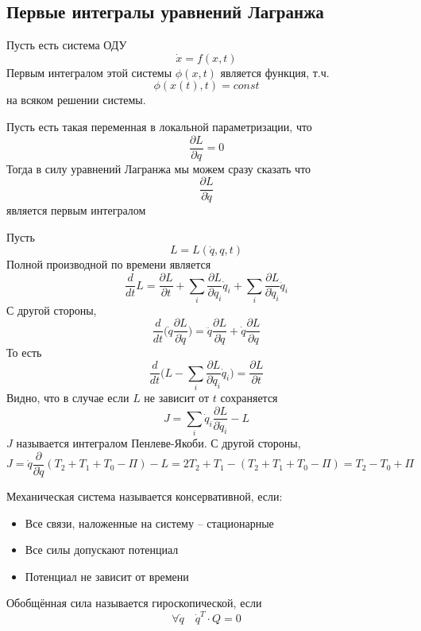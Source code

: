\subsection{Первые интегралы уравнений Лагранжа}
\begin{definition}
    Пусть есть система ОДУ \[\dot{x} = f(x, t)\]
    Первым интегралом этой системы $\phi(x, t)$ является функция, т.ч. \[
    \phi(x(t), t) = const
    \]
    на всяком решении системы.
\end{definition}
\begin{property}
    Пусть есть такая переменная в локальной параметризации, что \[\dfrac{\partial L}{\partial q} = 0\]
    Тогда в силу уравнений Лагранжа мы можем сразу сказать что \[ \dfrac{\partial L}{\partial \dot{q}}\] является первым интегралом
\end{property}
\begin{property}
    Пусть \[L = L(\dot{q}, q, t)\]
    Полной производной по времени является \[\dfrac{d}{dt}L = \dfrac{\partial L}{\partial t} + \sum\limits_i \dfrac{\partial L}{\partial q_i}\dot{q}_i + \sum\limits_i \dfrac{\partial L}{\partial \dot{q}_i} \ddot{q}_i\]
    С другой стороны, \[\dfrac{d}{dt}\biggr(\dot{q}\dfrac{\partial L}{\partial \dot{q}}\biggr) = \ddot{q}\dfrac{\partial L}{\partial \dot{q}} + \dot{q}\dfrac{\partial L}{\partial q}\]
    То есть \[\dfrac{d}{dt}\biggr( L - \sum\limits_i\dfrac{\partial L}{\partial \dot{q}_i}\dot{q}_i\biggr) = \dfrac{\partial L}{\partial t}\]
    Видно, что в случае если $L$ не зависит от $t$ сохраняется \[J = \sum\limits_i \dot{q}_i \dfrac{\partial L}{\partial \dot{q}_i} - L\]
    $J$ называется интегралом Пенлеве-Якоби. С другой стороны, \[J = \dot{q}\dfrac{\partial }{\partial \dot{q}}(T_2 + T_1 + T_0 - \Pi) - L = 2T_2 + T_1 - (T_2 + T_1 + T_0 - \Pi) = T_2 - T_0 + \Pi\]
\end{property}
\begin{definition}
    Механическая система называется консервативной, если: 
    \begin{itemize}
        \item Все связи, наложенные на систему -- стационарные
        \item Все силы допускают потенциал
        \item Потенциал не зависит от времени
    \end{itemize}
\end{definition}
\begin{definition}
Обобщённая сила называется гироскопической, если \[\forall \dot{q} \quad \dot{q}^T \cdot Q = 0\]
\end{definition}
